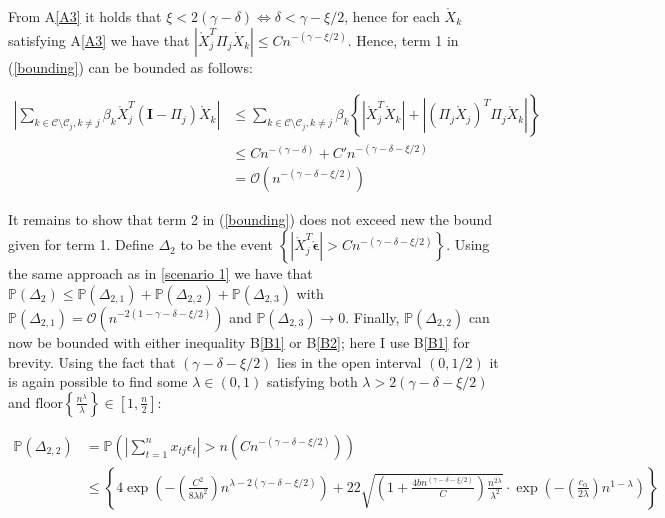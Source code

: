 \documentclass[11pt]{report}\usepackage[utf8]{inputenc}
\begin{document}
From A\ref{A3} it holds that $\xi < 2(\gamma - \delta)  \Leftrightarrow  \delta < \gamma - \xi/2$, hence for each $\mathring{X}_k$ satisfying A\ref{A3} we have that $\left | \mathring{X}_j^T\Pi_j \mathring{X}_k \right | \leq Cn^{-(\gamma - \xi/2)}$. Hence, term 1 in (\ref{bounding}) can be bounded as follows: 

\begin{align*}
     \left | \sum_{k \in \mathcal{C} \setminus \mathcal{C}_j, k \neq j } \beta_k \mathring{X}_j^T (\mathbf{I} - \Pi_j) \mathring{X}_k \right | & \leq \sum_{k \in \mathcal{C} \setminus  \mathcal{C}_j, k \neq j } \beta_k\left \{ \left | \mathring{X}_j^T \mathring{X}_k \right | + \left | (\Pi_j \mathring{X}_j)^T\Pi_j \mathring{X}_k \right | \right \} \\
     & \leq Cn^{-(\gamma - \delta)} + C'n^{-(\gamma - \delta - \xi/2)} \\
     & = \mathcal{O}(n^{-(\gamma - \delta - \xi/2)})
\end{align*}

It remains to show that term 2 in (\ref{bounding}) does not exceed new the bound given for term 1. Define $\Delta_2$ to be the event $\left \{ \left | \mathring{X}_j^T\mathring{\boldsymbol{\epsilon}} \right | > Cn^{-\left ( \gamma-\delta - \xi/2 \right )}  \right \}$. Using the same approach as in \ref{scenario 1} we have that $\mathbb{P}\left ( \Delta_2 \right ) \leq \mathbb{P}\left ( \Delta_{2,1} \right ) + \mathbb{P}\left ( \Delta_{2,2} \right ) + \mathbb{P}\left ( \Delta_{2,3} \right )$ with $\mathbb{P}\left ( \Delta_{2,1} \right ) = \mathcal{O}\left ( n^{-2(1-\gamma-\delta - \xi/2)} \right )$ and $\mathbb{P}\left ( \Delta_{2,3} \right ) \rightarrow 0$. Finally, $\mathbb{P}\left ( \Delta_{2,2} \right )$ can now be bounded with either inequality B\ref{B1} or B\ref{B2}; here I use B\ref{B1} for brevity. Using the fact that $\left ( \gamma - \delta - \xi/2 \right )$ lies in the open interval $(0,1/2)$ it is again possible to find some $\lambda \in (0,1)$ satisfying both $\lambda > 2 \left ( \gamma - \delta - \xi/2 \right )$ and $\text{floor}\left \{ \frac{n^\lambda}{\lambda} \right \} \in \left [ 1, \frac{n}{2} \right ]$: 

\begin{align*}
    \mathbb{P}\left ( \Delta_{2,2} \right ) & = \mathbb{P}\left ( \left | \sum_{t=1}^n x_{tj} \epsilon_t \right | > n \left (C n^{-( \gamma - \delta - \xi/2)} \right ) \right ) \\
    & \leq \left \{ 4 \exp\left ( -\left ( \frac{C^2}{8\lambda b^2} \right ) n^{\lambda-2(\gamma - \delta - \xi/2)} \right ) + 22 \sqrt{\left( 1 + \frac{4bn^{(\gamma-\delta -\xi/2)}}{C}\right ) \frac{n^{2 \lambda}}{\lambda^2}} \cdot \exp\left ( -\left ( \frac{c_\alpha}{2\lambda} \right ) n^{1-\lambda}  \right ) \right \}
\end{align*}
\end{document}
